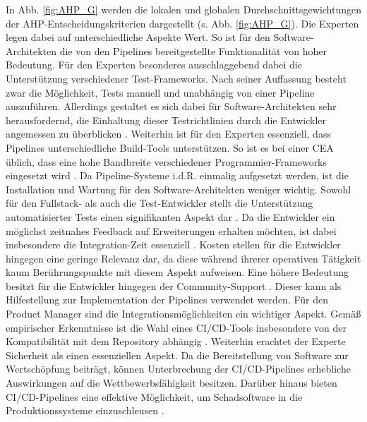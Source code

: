 In Abb. \ref*{fig:AHP_G} werden die lokalen und globalen Durchschnittsgewichtungen der AHP-Entscheidungskriterien dargestellt (s. Abb. \ref{fig:AHP_G}). Die Experten legen dabei auf unterschiedliche Aspekte Wert. So ist für den Software-Architekten die von den Pipelines bereitgestellte Funktionalität von hoher Bedeutung. Für den Experten besonderes ausschlaggebend dabei die Unterstützung verschiedener Test-Frameworks. Nach seiner Auffassung besteht zwar die Möglichkeit, Tests manuell und unabhängig von einer Pipeline auszuführen. Allerdings gestaltet es sich dabei für Software-Architekten sehr herausfordernd, die Einhaltung dieser Testrichtlinien durch die Entwickler angemessen zu überblicken \cite[Z. 16]{SoftwareArchitektSAPDTSIntegration.}. Weiterhin ist für den Experten essenziell, dass Pipelines unterschiedliche Build-Tools unterstützen. So ist es bei einer CEA üblich, dass eine hohe Bandbreite verschiedener Programmier-Frameworks eingesetzt wird \cite[Z. 11]{SoftwareArchitektSAPDTSIntegration.}. Da Pipeline-Systeme i.d.R. einmalig aufgesetzt werden, ist die Installation und Wartung für den Software-Architekten weniger wichtig. Sowohl für den Fullstack- als auch die Test-Entwickler stellt die Unterstützung automatisierter Tests einen signifikanten Aspekt dar \cite[Z. 4]{BackendTestDeveloperSAPDTSIntegration.}. Da die Entwickler ein möglichst zeitnahes Feedback auf Erweiterungen erhalten möchten, ist dabei insbesondere die Integration-Zeit essenziell \cite[Z. 21]{TestDeveloperSAPHyperspaceAdoption&Onboarding.b}. Kosten stellen für die Entwickler hingegen eine geringe Relevanz dar, da diese während ihrerer operativen Tätigkeit kaum Berührungspunkte mit diesem Aspekt aufweisen. Eine höhere Bedeutung besitzt für die Entwickler hingegen der Community-Support \cite[Z. 24]{FullStackEntwicklerSAPDTSIntegration.}. Dieser kann als Hilfestellung zur Implementation der Pipelines verwendet werden. Für den Product Manager sind die Integrationsmöglichkeiten ein wichtiger Aspekt. Gemäß empirischer Erkenntnisse ist die Wahl eines CI/CD-Tools insbesondere von der Kompatibilität mit dem Repository abhängig \cite[Z. 3]{exp8}. Weiterhin erachtet der Experte Sicherheit als einen essenziellen Aspekt. Da die Bereitstellung von Software zur Wertschöpfung beiträgt, können Unterbrechung der CI/CD-Pipelines erhebliche Auswirkungen auf die Wettbewerbsfähigkeit besitzen. Darüber hinaus bieten CI/CD-Pipelines eine effektive Möglichkeit, um Schadsoftware in die Produktionssysteme einzuschleusen \cite[Z. 6]{exp8}. 

